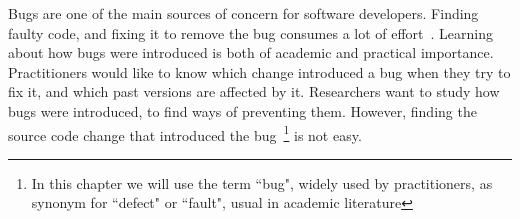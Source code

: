 

Bugs are one of the main sources of concern for software developers. Finding faulty code, and fixing it to remove the bug consumes a lot of effort~\cite{kim2006long,weiss2007long}. Learning about how bugs were introduced is both of academic and practical importance. Practitioners would like to know which change introduced a bug when they try to fix it, and which past versions are affected by it. Researchers want to study how bugs were introduced, to find ways of preventing them. However, finding the source code change that introduced the bug~\footnote{In this chapter we will use the term ``bug", widely used by practitioners, as synonym for ``defect" or ``fault", usual in academic literature\cite{5399061,1335465,tan2014bug}} is not easy.



